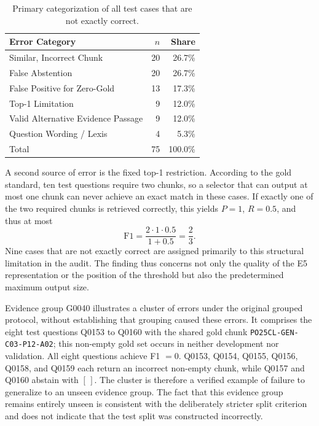\documentclass[11pt]{article}
\newcommand{\revision}[1]{#1}
\begin{document}
\begin{table}[t]
\centering
\small
\begin{tabular}{lrr}
\toprule
\textbf{Error Category} & \textbf{$n$} & \textbf{Share} \\
\midrule
Similar, Incorrect Chunk & 20 & 26.7\% \\
False Abstention & 20 & 26.7\% \\
False Positive for Zero-Gold & 13 & 17.3\% \\
Top-1 Limitation & 9 & 12.0\% \\
Valid Alternative Evidence Passage & 9 & 12.0\% \\
Question Wording / Lexis & 4 & 5.3\% \\
\midrule
Total & 75 & 100.0\% \\
\bottomrule
\end{tabular}
\caption{Primary categorization of all test cases that are not exactly correct.}
\label{tab:error-analysis}
\end{table}

A second source of error is the fixed top-1 restriction. According to the gold standard, ten test questions require two chunks, so a selector that can output at most one chunk can never achieve an exact match in these cases. If exactly one of the two required chunks is retrieved correctly, this yields $P=1$, $R=0.5$, and thus at most
\begin{equation}
\mathrm{F1}=\frac{2\cdot1\cdot0.5}{1+0.5}=\frac{2}{3}.
\end{equation}
Nine cases that are not exactly correct are assigned primarily to this structural limitation in the audit. The finding thus concerns not only the quality of the E5 representation or the position of the threshold but also the predetermined maximum output size.

\revision{Evidence group G0040 illustrates a cluster of errors under the original grouped protocol, without establishing that grouping caused these errors.} It comprises the eight test questions Q0153 to Q0160 with the shared gold chunk \texttt{PO25CL-GEN-C03-P12-A02}; this non-empty gold set occurs in neither development nor validation. All eight questions achieve F1 $=0$. Q0153, Q0154, Q0155, Q0156, Q0158, and Q0159 each return an incorrect non-empty chunk, while Q0157 and Q0160 abstain with $[\,]$. The cluster is therefore a verified example of failure to generalize to an unseen evidence group. The fact that this evidence group remains entirely unseen is consistent with the deliberately stricter split criterion and does not indicate that the test split was constructed incorrectly.
\end{document}
